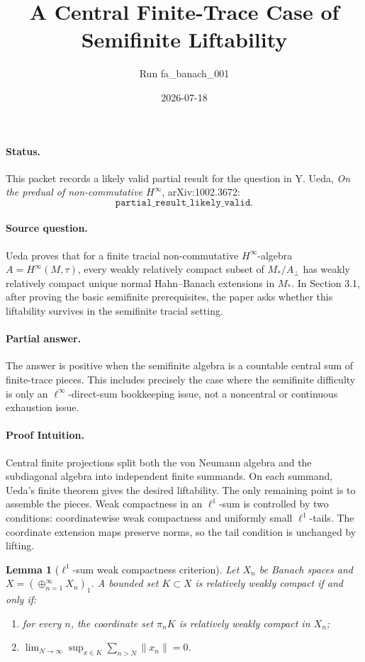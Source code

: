 \documentclass[11pt]{article}
\title{A Central Finite-Trace Case of Semifinite Liftability}
\author{Run fa\_banach\_001}
\date{2026-07-18}
\newtheorem{lemma}{Lemma}
\begin{document}
\maketitle

\paragraph{Status.}
This packet records a likely valid partial result for the question in
Y. Ueda, \emph{On the predual of non-commutative \(H^\infty\)},
arXiv:1002.3672:
\[
\texttt{partial\_result\_likely\_valid.}
\]

\paragraph{Source question.}
Ueda proves that for a finite tracial non-commutative \(H^\infty\)-algebra
\(A=H^\infty(M,\tau)\), every weakly relatively compact subset of
\(M_\ast/A_\perp\) has weakly relatively compact unique normal Hahn--Banach
extensions in \(M_\ast\).  In Section 3.1, after proving the basic
semifinite prerequisites, the paper asks whether this liftability survives in
the semifinite tracial setting.

\paragraph{Partial answer.}
The answer is positive when the semifinite algebra is a countable central
sum of finite-trace pieces.  This includes precisely the case where the
semifinite difficulty is only an \(\ell^\infty\)-direct-sum bookkeeping issue,
not a noncentral or continuous exhaustion issue.

\paragraph{Proof Intuition.}
Central finite projections split both the von Neumann algebra and the
subdiagonal algebra into independent finite summands.  On each summand,
Ueda's finite theorem gives the desired liftability.  The only remaining
point is to assemble the pieces.  Weak compactness in an \(\ell^1\)-sum is
controlled by two conditions: coordinatewise weak compactness and uniformly
small \(\ell^1\)-tails.  The coordinate extension maps preserve norms, so the
tail condition is unchanged by lifting.

\begin{lemma}[\(\ell^1\)-sum weak compactness criterion]
Let \(X_n\) be Banach spaces and \(X=(\oplus_{n=1}^\infty X_n)_1\).  A bounded
set \(K\subset X\) is relatively weakly compact if and only if:
\begin{enumerate}
\item for every \(n\), the coordinate set \(\pi_n K\) is relatively weakly
compact in \(X_n\);
\item \(\displaystyle \lim_{N\to\infty}\sup_{x\in K}\sum_{n>N}\|x_n\|=0\).
\end{enumerate}
\end{lemma}
\end{document}
